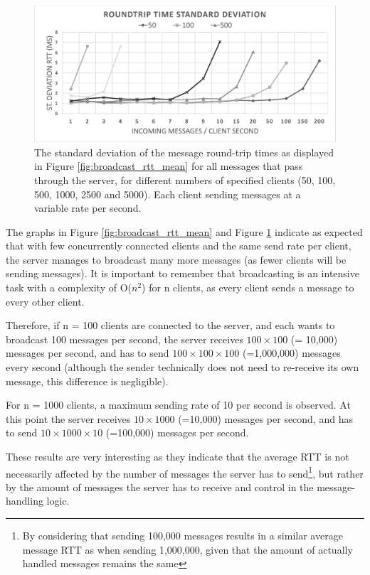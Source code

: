 \documentclass[bsc, 12pt, twoside, singlespacing, parskip, abbrevs, notimes, normalheadings, logo]{styles/infthesis}
\begin{document}
\begin{figure}[H]
\centering
\includegraphics[scale=0.58]{images/test_SERVER_RTTstd.eps}
\caption{The standard deviation of the message round-trip times as displayed in Figure \ref{fig:broadcast_rtt_mean} for all messages that pass through the server, for different numbers of specified clients (50, 100, 500, 1000, 2500 and 5000). Each client sending messages at a variable rate per second.}
\label{fig:broadcast_rtt_std}
\end{figure}

The graphs in Figure \ref{fig:broadcast_rtt_mean} and Figure \ref{fig:broadcast_rtt_std} indicate as expected that with few concurrently connected clients and the same send rate per client, the server manages to broadcast many more messages (as fewer clients will be sending messages). It is important to remember that broadcasting is an intensive task with a complexity of O($n^{2}$) for n clients, as every client sends a message to every other client.

Therefore, if n = 100 clients are connected to the server, and each wants to broadcast 100 messages per second, the server receives $100 \times 100$ (= 10,000) messages per second, and has to send $100 \times 100 \times 100$ (=1,000,000) messages every second (although the sender technically does not need to re-receive its own message, this difference is negligible).

For n = 1000 clients, a maximum sending rate of 10 per second is observed. At this point the server receives $10 \times 1000$ (=10,000) messages per second, and has to send $10 \times 1000 \times 10$ (=100,000) messages per second.

These results are very interesting as they indicate that the average RTT is not necessarily affected by the number of messages the server has to send\footnote{By considering that sending 100,000 messages results in a similar average message RTT as when sending 1,000,000, given that the amount of actually handled messages remains the same}, but rather by the amount of messages the server has to receive and control in the message-handling logic.
\end{document}
